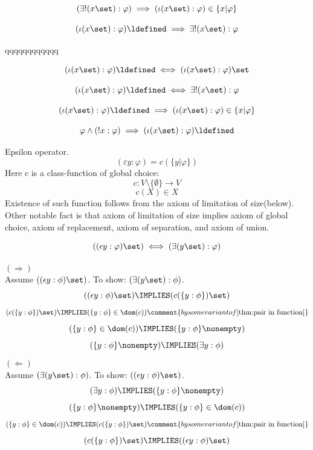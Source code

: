 \begin{axiom}
\[
(\exists! (x\set):\varphi)
\implies
(\iota (x\set): \varphi) \in \{x|\varphi\}
\]
\end{axiom}
\begin{axiom}
\[
(\iota (x\set): \varphi) \ldefined
\implies
\exists! (x\set):\varphi
\]
\end{axiom}
qqqqqqqqqqqq
\begin{axiom}
\[
(\iota (x\set): \varphi) \ldefined
\iff
(\iota (x\set): \varphi) \set
\]
\end{axiom}
\begin{axiom}
\[
(\iota (x\set): \varphi) \ldefined
\iff
\exists! (x\set):\varphi
\]
\end{axiom}
\begin{axiom}
\[
(\iota (x\set): \varphi) \ldefined
\implies
(\iota (x\set): \varphi)  \in \{x|\varphi\}
\]
\end{axiom}
\begin{axiom}
\[
\varphi\land (!x:\varphi)
\implies
(\iota (x\set): \varphi) \ldefined
\]
\end{axiom}

\begin{definition}
\label{def:epsilon operator}
Epsilon operator.
\[
(\varepsilon y: \varphi) = c\left(\{y|\varphi\}\right)
\]
Here c is a class-function of global choice:
\[
c:V\setminus\{\emptyset\}\to V
\]
\[
c(X)\in X
\]
Existence of such function follows from the axiom of limitation of size(below).
Other notable fact is that axiom of limitation of size implies axiom of global choice, axiom of replacement, axiom of separation, and axiom of union.
\end{definition}

\begin{theorem}
\[
((\epsilon y: \varphi) \set)
\iff
(\exists(y\set):\varphi)
\]
\end{theorem}
\Proof
$(\Rightarrow)$\\
Assume $((\epsilon y: \phi) \set)$. To show: $(\exists(y\set):\phi)$.
\[
((\epsilon y: \phi) \set)
\IMPLIES
(c(\{y:\phi\})\set)
\]
\[
(c(\{y:\phi\})\set)
\IMPLIES
(\{y:\phi\}\in\dom(c))
\comment{by some variant of \ref{thm:pair in function} }
\]
\[
(\{y:\phi\}\in\dom(c))
\IMPLIES
(\{y:\phi\}\nonempty)
\]
\[
(\{y:\phi\}\nonempty)
\IMPLIES
(\exists y:\phi)
\]
$(\Leftarrow)$\\
Assume $(\exists(y\set):\phi)$. To show: $((\epsilon y: \phi) \set)$.
\[
(\exists y:\phi)
\IMPLIES
(\{y:\phi\}\nonempty)
\]
\[
(\{y:\phi\}\nonempty)
\IMPLIES
(\{y:\phi\}\in\dom(c))
\]
\[
(\{y:\phi\}\in\dom(c))
\IMPLIES
(c(\{y:\phi\})\set)
\comment{by some variant of \ref{thm:pair in function} }
\]
\[
(c(\{y:\phi\})\set)
\IMPLIES
((\epsilon y: \phi) \set)
\]
\Done

